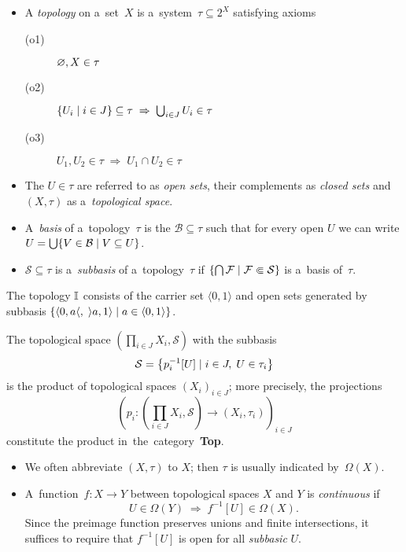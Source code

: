 \begin{itemize}
\item A \emph{topology} on a~set~$X$ is a~system~$\tau\subseteq 2^X$ satisfying
axioms
  \begin{description}
  \item[(o1)] $\varnothing, X \in \tau$
  \item[(o2)] $\left\{ U_i \mid i\in J \right\} \subseteq \tau \; \Rightarrow \;
  \bigcup_{i\in J} U_i \in \tau$
  \item[(o3)] $U_1, U_2 \in \tau \; \Rightarrow \; U_1 \cap U_2 \in \tau$
  \end{description}

\item The $U\in \tau$ are referred to as \emph{open sets\/}, their complements
as \emph{closed sets\/} and $(X, \tau)$ as a~\emph{topological space\/}.

\item A~\emph{basis} of a~topology~$\tau$ is the $\mathcal{B}\subseteq \tau$
such that for every open $U$ we can write $U = \bigcup \{V\in \mathcal{B} \mid
V\subseteq U \}$.

\item $\mathcal{S}\subseteq \tau$ is a~\emph{subbasis} of a~topology~$\tau$ if
$\left\{ \bigcap \mathcal{F} \mid \mathcal{F} \Subset \mathcal{S} \right\}$ is
a~basis of~$\tau$.
\end{itemize}

\begin{exmpl}
  The topology $\mathbb{I}$ consists of the carrier set $\langle 0, 1 \rangle$ and open
  sets generated by subbasis $\{ \langle 0, a \langle, \; \rangle a, 1 \rangle
  \mid a\in \langle 0, 1 \rangle \}$.
\end{exmpl}

\begin{exmpl}
  The topological space $\left( \prod_{i\in J} X_i, \mathcal{S} \right)$ with
  the subbasis
  \[
    \mathcal{S} = \left\{ p_{i}^{-1}[U] \mid i\in J, \; U\in \tau_i \right\}
  \]
  is the product of topological spaces $\left( X_i \right)_{i\in J}$;
  more precisely, the projections
  \[
    \left( p_i\colon \left(\prod_{i\in J} X_i, \mathcal{S}\right) \to
    \left(X_i, \tau_i\right) \right)_{i\in J}
  \]
  constitute the product in~the~category~{\bf Top}.
\end{exmpl}

\begin{itemize}
\item We often abbreviate $(X, \tau)$ to $X$;
then $\tau$ is usually indicated by~$\Omega(X)$.

\item A~function~$f\colon X \to Y$ between topological spaces $X$ and $Y$ is
\emph{continuous} if 
\[
  U\in \Omega(Y) \; \Longrightarrow \; f^{-1}[U]\in \Omega(X).
\]
Since the preimage function preserves unions and finite intersections, it
suffices to require that $f^{-1}[U]$ is open for all \emph{subbasic\/} $U$.
\end{itemize}


